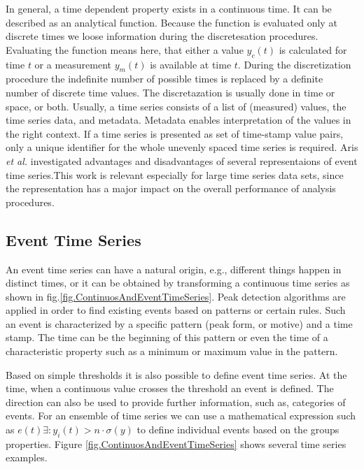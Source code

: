 \documentclass[a4paper,10pt]{scrbook}
\begin{document}
In general, a time dependent property exists in a continuous time. It can be described as an analytical function. Because the function is evaluated only at discrete times we loose information during the discretesation procedures. Evaluating the function means here, that either a value $y_c(t)$ is calculated for time $t$ or a measurement $y_m(t)$ is available at time $t$. During the discretization procedure the indefinite number of possible times is replaced by a definite number of discrete time values. The discretazation is usually done in time or space, or both. Usually, a time series consists of a list of (measured) values, the time series data, and metadata. Metadata enables interpretation of the values in the right context. If a time series is presented as set of time-stamp value pairs, only a unique identifier for the whole unevenly spaced time series is required. Aris \textit{et al.} \cite{Aris2005} investigated advantages and disadvantages of several representaions of event time series.This work is relevant especially for large time series data sets, since the representation has a major impact on the overall performance of analysis procedures. 

\subsection{Event Time Series}
An event time series can have a natural origin, e.g., different things happen in distinct times, or it can be obtained by transforming a continuous time series as shown in fig.\ref{fig.ContinuosAndEventTimeSeries}. Peak detection algorithms are applied in order to find existing events based on patterns or certain rules. Such an event is characterized by a specific pattern (peak form, or motive) and a time stamp. The time can be the beginning of this pattern or even the time of a characteristic property such as a minimum or maximum value in the pattern. 

Based on simple thresholds it is also possible to define event time series. At the time, when a continuous value crosses the threshold an event is defined. The direction can also be used to provide further information, such as, categories of events. For an ensemble of time series we can use a mathematical expression such as $e(t)  \exists : y_i(t) >  n \cdot \sigma( y )$ to define individual events based on the groups properties. Figure \ref{fig.ContinuosAndEventTimeSeries} shows several time series examples. 

\label{ext.fig.ContinuosAndEventTimeSeries} 

\end{document}
